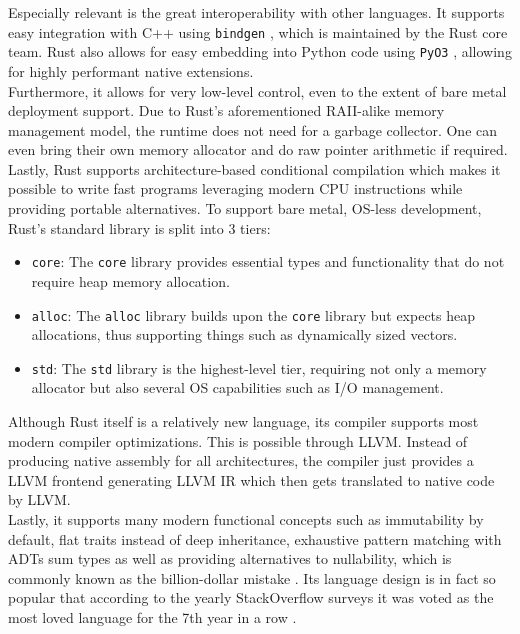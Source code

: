 Especially relevant is the great interoperability with other languages. It supports easy integration with C++ using \texttt{bindgen} \cite{bindgen}, which is maintained by the Rust core team. Rust also allows for easy embedding into Python code using \texttt{PyO3} \cite{pyo3}, allowing for highly performant native extensions.\\

Furthermore, it allows for very low-level control, even to the extent of bare metal deployment support. Due to Rust's aforementioned \ac{RAII}-alike memory management model, the runtime does not need for a garbage collector. One can even bring their own memory allocator and do raw pointer arithmetic if required. Lastly, Rust supports architecture-based conditional compilation which makes it possible to write fast programs leveraging modern CPU instructions while providing portable alternatives. To support bare metal, OS-less development, Rust's standard library is split into 3 tiers:

\begin{itemize}
  \item \texttt{core}: The \texttt{core} library provides essential types and functionality that do not require heap memory allocation.
  \item \texttt{alloc}: The \texttt{alloc} library builds upon the \texttt{core} library but expects heap allocations, thus supporting things such as dynamically sized vectors.
  \item \texttt{std}: The \texttt{std} library is the highest-level tier, requiring not only a memory allocator but also several OS capabilities such as I/O management.
\end{itemize}

Although Rust itself is a relatively new language, its compiler supports most modern compiler optimizations. This is possible through \ac{LLVM}. Instead of producing native assembly for all architectures, the compiler just provides a \ac{LLVM} frontend generating \ac{LLVM} \ac{IR} which then gets translated to native code by \ac{LLVM}.\\

Lastly, it supports many modern functional concepts such as immutability by default, flat traits instead of deep inheritance, exhaustive pattern matching with \acp{ADT} sum types as well as providing alternatives to nullability, which is commonly known as the billion-dollar mistake \cite{null}. Its language design is in fact so popular that according to the yearly StackOverflow surveys it was voted as the most loved language for the 7th year in a row \cite{sosurvey}.

